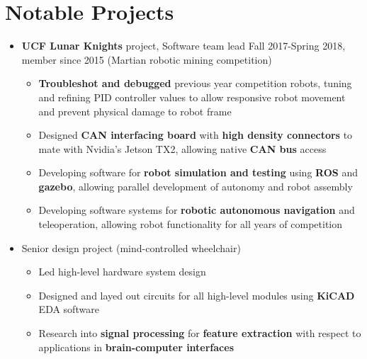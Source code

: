 \documentclass{my_resume}
\begin{document}
\section{Notable Projects}
\begin{itemize}[noitemsep]
    \item \textbf{UCF Lunar Knights} project, Software team lead Fall 2017-Spring 2018, member since 2015 (Martian robotic mining competition)
        \begin{itemize}[noitemsep]
          \item \textbf{Troubleshot and debugged} previous year competition robots, tuning and refining PID controller values to allow responsive robot movement and prevent physical damage to robot frame
          \item Designed \textbf{CAN interfacing board} with \textbf{high density connectors} to mate with Nvidia's Jetson TX2, allowing native \textbf{CAN bus} access
          \item Developing software for \textbf{robot simulation and testing} using \textbf{ROS} and \textbf{gazebo}, allowing parallel development of autonomy and robot assembly
          \item Developing software systems for \textbf{robotic autonomous navigation} and teleoperation, allowing robot functionality for all years of competition
        \end{itemize}
      \item Senior design project (mind-controlled wheelchair)
        \begin{itemize}[noitemsep]
            \item Led high-level hardware system design
            \item Designed and layed out circuits for all high-level modules using \textbf{KiCAD} EDA software
            \item Research into \textbf{signal processing} for \textbf{feature extraction} with respect to applications in \textbf{brain-computer interfaces}
        \end{itemize}
\end{itemize}
\end{document}
